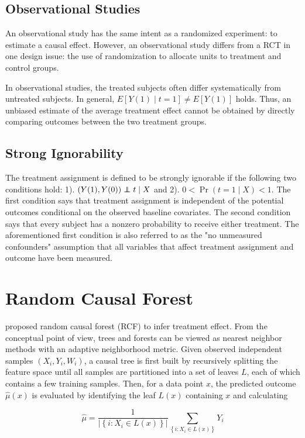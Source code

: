\documentclass{article}
\newcommand\independent{\protect\mathpalette{\protect\independenT}{\perp}}
\def\independenT#1#2{\mathrel{\rlap{$#1#2$}\mkern2mu{#1#2}}}
\begin{document}
\subsection{Observational Studies}
An observational study has the same intent as a randomized experiment:
to estimate a causal effect. However, an observational study differs
from a RCT in one design issue: the use of randomization to allocate
units to treatment and control groups.

In observational studies, the treated subjects often differ
systematically from untreated subjects. In general, $E[Y(1)\mid t=1]
\neq E[Y(1)]$ holds. Thus, an unbiased estimate of the average
treatment effect cannot be obtained by directly comparing outcomes
between the two treatment groups.

\subsection{Strong Ignorability}
The treatment assignment is defined to be strongly ignorable
\cite{rosenbaum1983central} if the following two conditions hold: 1).
$(Y(1), Y(0)) \independent t\mid X$ and 2). $0 < \Pr (t=1 \mid X) <
1$. The first condition says that treatment assignment is independent
of the potential outcomes conditional on the observed baseline
covariates. The second condition says that every subject has a nonzero
probability to receive either treatment. The aforementioned first
condition is also referred to as the "no unmeasured confounders"
assumption that all variables that affect treatment assignment and
outcome have been measured.
\section{Random Causal Forest}
\cite{wager2015estimation} proposed random causal forest (RCF) to
infer treatment effect. From the conceptual point of view, trees and forests can be viewed as
nearest neighbor methods with an adaptive neighborhood metric. Given
observed independent samples $(X_i, Y_i, W_i)$, a causal tree is first
built by recursively splitting the feature space until all samples are
partitioned into a set of leaves $L$, each of which contains a few
training samples. Then, for a data point $x$, the predicted outcome $\hat{\mu}(x)$
is evaluated by identifying the leaf $L(x)$ containing $x$ and
calculating

$$\hat{\mu} = \frac{1}{\left | \left \{ i: X_i \in L(x) \right \}
  \right |} \sum_{\left \{ i: X_i \in L(x) \right \}} Y_i$$
\end{document}
